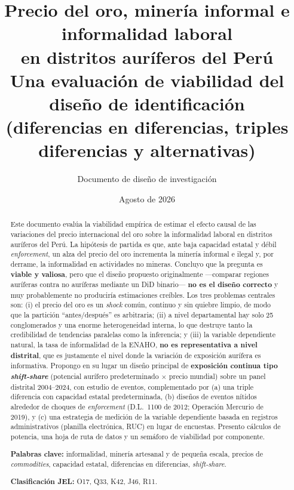 \documentclass[11pt,a4paper]{article}
\title{\textbf{Precio del oro, minería informal e informalidad laboral\\ en distritos auríferos del Perú}\\[0.6em]
\large Una evaluación de viabilidad del diseño de identificación\\
\large (diferencias en diferencias, triples diferencias y alternativas)}
\author{Documento de diseño de investigación}
\date{Agosto de 2026}
\begin{document}
\maketitle

\begin{abstract}
\noindent Este documento evalúa la viabilidad empírica de estimar el efecto causal de las variaciones del precio internacional del oro sobre la informalidad laboral en distritos auríferos del Perú. La hipótesis de partida es que, ante baja capacidad estatal y débil \emph{enforcement}, un alza del precio del oro incrementa la minería informal e ilegal y, por derrame, la informalidad en actividades no mineras. Concluyo que la pregunta es \textbf{viable y valiosa}, pero que el diseño propuesto originalmente ---comparar regiones auríferas contra no auríferas mediante un DiD binario--- \textbf{no es el diseño correcto} y muy probablemente no produciría estimaciones creíbles. Los tres problemas centrales son: (i) el precio del oro es un \emph{shock} común, continuo y sin quiebre limpio, de modo que la partición ``antes/después'' es arbitraria; (ii) a nivel departamental hay solo 25 conglomerados y una enorme heterogeneidad interna, lo que destruye tanto la credibilidad de tendencias paralelas como la inferencia; y (iii) la variable dependiente natural, la tasa de informalidad de la ENAHO, \textbf{no es representativa a nivel distrital}, que es justamente el nivel donde la variación de exposición aurífera es informativa. Propongo en su lugar un diseño principal de \textbf{exposición continua tipo \emph{shift-share}} (potencial aurífero predeterminado $\times$ precio mundial) sobre un panel distrital 2004--2024, con estudio de eventos, complementado por (a) una triple diferencia con capacidad estatal predeterminada, (b) diseños de eventos nítidos alrededor de choques de \emph{enforcement} (D.L.~1100 de 2012; Operación Mercurio de 2019), y (c) una estrategia de medición de la variable dependiente basada en registros administrativos (planilla electrónica, RUC) en lugar de encuestas. Presento cálculos de potencia, una hoja de ruta de datos y un semáforo de viabilidad por componente.

\medskip
\noindent\textbf{Palabras clave:} informalidad, minería artesanal y de pequeña escala, precios de \emph{commodities}, capacidad estatal, diferencias en diferencias, \emph{shift-share}.

\noindent\textbf{Clasificación JEL:} O17, Q33, K42, J46, R11.
\end{abstract}
\end{document}
